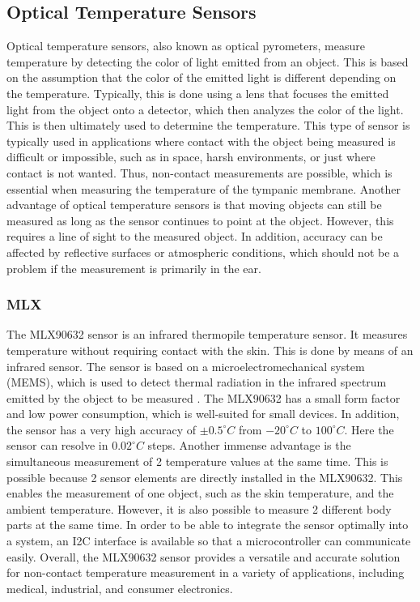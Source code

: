 \subsection{Optical Temperature Sensors}
\label{Background:TemperatureSensors:OpticalTS}
Optical temperature sensors, also known as optical pyrometers, measure temperature by detecting the color of light emitted from an object. 
This is based on the assumption that the color of the emitted light is different depending on the temperature.
Typically, this is done using a lens that focuses the emitted light from the object onto a detector, which then analyzes the color of the light. 
This is then ultimately used to determine the temperature.
This type of sensor is typically used in applications where contact with the object being measured is difficult or impossible, such as in space, harsh environments, or just where contact is not wanted.
Thus, non-contact measurements are possible, which is essential when measuring the temperature of the tympanic membrane.
Another advantage of optical temperature sensors is that moving objects can still be measured as long as the sensor continues to point at the object.
However, this requires a line of sight to the measured object.
In addition, accuracy can be affected by reflective surfaces or atmospheric conditions, which should not be a problem if the measurement is primarily in the ear.

\subsubsection{MLX}
\label{Background:TemperatureSensors:OpticalTS:MLX}
The MLX90632 sensor is an infrared thermopile temperature sensor.
It measures temperature without requiring contact with the skin. 
This is done by means of an infrared sensor. 
The sensor is based on a microelectromechanical system (MEMS), which is used to detect thermal radiation in the infrared spectrum emitted by the object to be measured \cite{melexisMLX90632FIRSensor2021}.
The MLX90632 has a small form factor and low power consumption, which is well-suited for small devices.
In addition, the sensor has a very high accuracy of $\pm 0.5 ^\circ C$ from $-20 ^\circ C$  to $100 ^\circ C$.
Here the sensor can resolve in $0.02 ^\circ C$ steps.
Another immense advantage is the simultaneous measurement of 2 temperature values at the same time.
This is possible because 2 sensor elements are directly installed in the MLX90632.
This enables the measurement of one object, such as the skin temperature, and the ambient temperature.
However, it is also possible to measure 2 different body parts at the same time.
In order to be able to integrate the sensor optimally into a system, an I2C interface is available so that a microcontroller can communicate easily.
Overall, the MLX90632 sensor provides a versatile and accurate solution for non-contact temperature measurement in a variety of applications, including medical, industrial, and consumer electronics.

